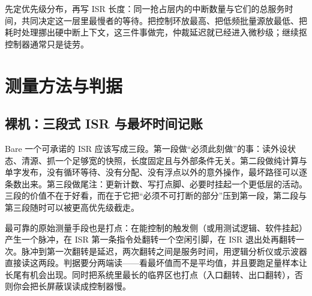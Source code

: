\documentclass[12pt,a4paper,fontset=fandol]{ctexbook}
\newcommand{\Lang}[1]{\textsf{#1}}
\newcommand{\DomBare}{\Lang{Bare}}
\begin{document}
\begin{bestpractice}[title={让关键中断不被排队}]
先定优先级分布，再写 ISR 长度：同一抢占层内的中断数量与它们的总服务时间，共同决定这一层里最慢者的等待。把控制环放最高、把低频批量源放最低、把耗时处理挪出硬中断上下文，这三件事做完，仲裁延迟就已经进入微秒级；继续抠控制器通常只是徒劳。
\end{bestpractice}

\section{测量方法与判据}
\label{sec:ch03-measure}

\subsection{裸机：三段式 ISR 与最坏时间记账}

\DomBare{} 一个可承诺的 ISR 应该写成三段。第一段做``必须此刻做''的事：读外设状态、清源、抓一个足够宽的快照，长度固定且与外部条件无关。第二段做纯计算与单字发布，没有循环等待、没有分配、没有浮点以外的意外操作，最坏路径可以逐条数出来。第三段做尾注：更新计数、写打点脚、必要时挂起一个更低层的活动。三段的价值不在于好看，而在于它把``必须不可打断的部分''压到第一段，第二段与第三段随时可以被更高优先级截走。

最可靠的原始测量手段也是打点：在能控制的触发侧（或用测试逻辑、软件挂起）产生一个脉冲，在 ISR 第一条指令处翻转一个空闲引脚，在 ISR 退出处再翻转一次。脉冲到第一次翻转是延迟，两次翻转之间是服务时间，用逻辑分析仪或示波器直接读这两段。判据要分两端读——看最坏值而不是平均值，并且要跑足量样本让长尾有机会出现。同时把系统里最长的临界区也打点（入口翻转、出口翻转），否则你会把长屏蔽误读成控制器慢。
\end{document}
